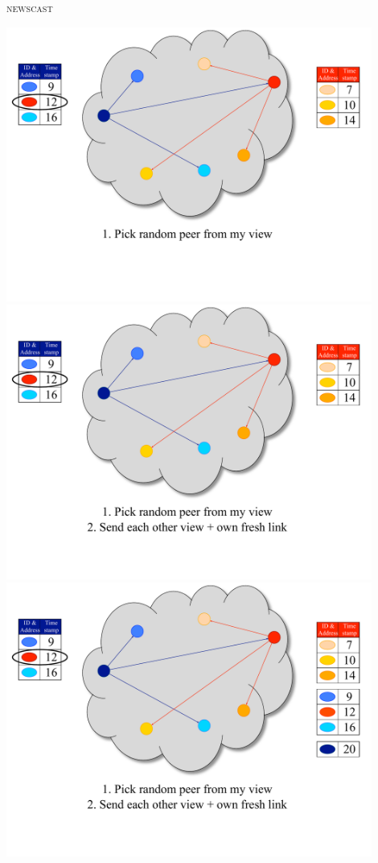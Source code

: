 \begin{frame}{\textsc{newscast}}
\begin{overprint}
\includegraphics[width=0.9\textwidth]{figs/11/4_newscast}
\includegraphics[width=0.9\textwidth]{figs/11/5_newscast}
\includegraphics[width=0.9\textwidth]{figs/11/6_newscast}

\end{overprint}
\end{frame}
